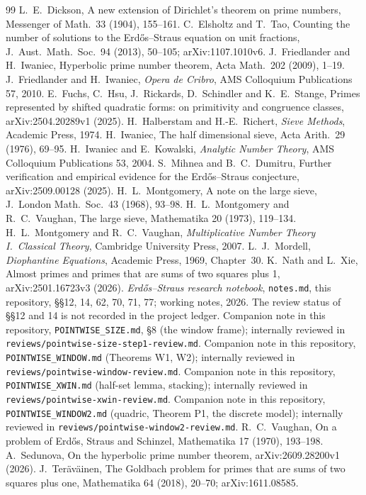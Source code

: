 \documentclass[11pt,reqno]{amsart}
\theoremstyle{definition}
\begin{document}
\begin{thebibliography}{99}
 L.~E.~Dickson, A new extension of Dirichlet's theorem on
prime numbers, Messenger of Math.\ 33 (1904), 155--161.
 C.~Elsholtz and T.~Tao, Counting the number of solutions to the
Erd\H{o}s--Straus equation on unit fractions, J.\ Aust.\ Math.\ Soc.\ 94
(2013), 50--105; arXiv:1107.1010v6.
 J.~Friedlander and H.~Iwaniec, Hyperbolic prime number
theorem, Acta Math.\ 202 (2009), 1--19.
 J.~Friedlander and H.~Iwaniec, \emph{Opera de Cribro}, AMS
Colloquium Publications 57, 2010.
 E.~Fuchs, C.~Hsu, J.~Rickards, D.~Schindler and
K.~E.~Stange, Primes represented by shifted quadratic forms: on
primitivity and congruence classes, arXiv:2504.20289v1 (2025).
 H.~Halberstam and H.-E.~Richert, \emph{Sieve Methods},
Academic Press, 1974.
 H.~Iwaniec, The half dimensional sieve, Acta Arith.\ 29
(1976), 69--95.
 H.~Iwaniec and E.~Kowalski, \emph{Analytic Number Theory},
AMS Colloquium Publications 53, 2004.
 S.~Mihnea and B.~C.~Dumitru, Further verification and
empirical evidence for the Erd\H{o}s--Straus conjecture, arXiv:2509.00128
(2025).
 H.~L.~Montgomery, A note on the large sieve,
J.\ London Math.\ Soc.\ 43 (1968), 93--98.
 H.~L.~Montgomery and R.~C.~Vaughan, The large sieve,
Mathematika 20 (1973), 119--134.
 H.~L.~Montgomery and R.~C.~Vaughan, \emph{Multiplicative
Number Theory I.~Classical Theory}, Cambridge University Press, 2007.
 L.~J.~Mordell, \emph{Diophantine Equations}, Academic
Press, 1969, Chapter~30.
 K.~Nath and L.~Xie, Almost primes and primes that are sums of
two squares plus 1, arXiv:2501.16723v3 (2026).
 \emph{Erd\H{o}s--Straus research notebook},
\texttt{notes.md}, this repository, \S\S12, 14, 62, 70, 71, 77; working
notes, 2026.  The review status of \S\S12 and 14 is not recorded in the
project ledger.
 Companion note in this repository, \texttt{POINTWISE\_SIZE.md},
\S8 (the window frame); internally reviewed in
\texttt{reviews/pointwise-size-step1-review.md}.
 Companion note in this repository,
\texttt{POINTWISE\_WINDOW.md} (Theorems W1, W2); internally reviewed in
\texttt{reviews/pointwise-window-review.md}.
 Companion note in this repository, \texttt{POINTWISE\_XWIN.md}
(half-set lemma, stacking); internally reviewed in
\texttt{reviews/pointwise-xwin-review.md}.
 Companion note in this repository,
\texttt{POINTWISE\_WINDOW2.md} (quadric, Theorem P1, the discrete model);
internally reviewed in \texttt{reviews/pointwise-window2-review.md}.
 R.~C.~Vaughan, On a problem of Erd\H{o}s, Straus and
Schinzel, Mathematika 17 (1970), 193--198.
 A.~Sedunova, On the hyperbolic prime number theorem,
arXiv:2609.28200v1 (2026).
 J.~Ter\"av\"ainen, The Goldbach problem for primes that are
sums of two squares plus one, Mathematika 64 (2018), 20--70;
arXiv:1611.08585.
\end{thebibliography}
\end{document}
